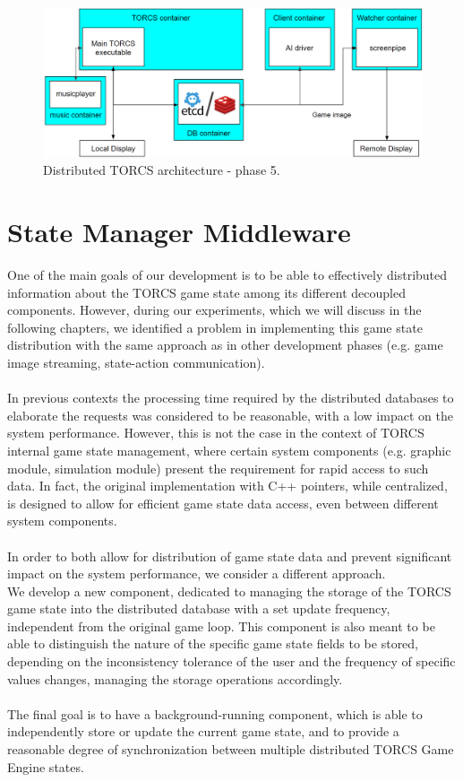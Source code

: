\begin{figure}[h!]
	\centering
	\includegraphics[width=0.95\linewidth]{"immagini/Software development/Development-5"}
	\caption[Distributed TORCS architecture - phase 5.]{Distributed TORCS architecture - phase 5.}
	\label{fig:development-5}
\end{figure}


\section{State Manager Middleware}\label{state-manager-middleware}
One of the main goals of our development is to be able to effectively distributed information about the TORCS game state among its different decoupled components. However, during our experiments, which we will discuss in the following chapters, we identified a problem in implementing this game state distribution with the same approach as in other development phases (e.g. game image streaming, state-action communication). \\ \\
In previous contexts the processing time required by the distributed databases to elaborate the requests was considered to be reasonable, with a low impact on the system performance. However, this is not the case in the context of TORCS internal game state management, where certain system components (e.g. graphic module, simulation module) present the requirement for rapid access to such data. In fact, the original implementation with C++ pointers, while centralized, is designed to allow for efficient game state data access, even between different system components. \\ \\
In order to both allow for distribution of game state data and prevent significant impact on the system performance, we consider a different approach. \\
We develop a new component, dedicated to managing the storage of the TORCS game state into the distributed database with a set update frequency, independent from the original game loop. This component is also meant to be able to distinguish the nature of the specific game state fields to be stored, depending on the inconsistency tolerance of the user and the frequency of specific values changes, managing the storage operations accordingly. \\ \\
The final goal is to have a background-running component, which is able to independently store or update the current game state, and to provide a reasonable degree of synchronization between multiple distributed TORCS Game Engine states.

